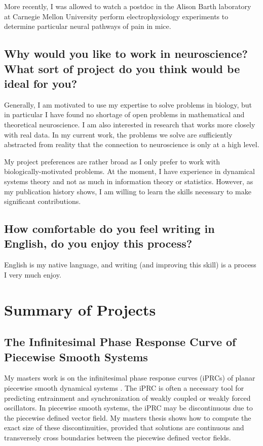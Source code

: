 \documentclass[a4paper,11pt]{article}
\begin{document}
More recently, I was allowed to watch a postdoc in the Alison Barth laboratory at Carnegie Mellon University perform electrophysiology experiments to determine particular neural pathways of pain in mice.

\subsection{Why would you like to work in neuroscience? What sort of project do you think would be ideal for you?}
Generally, I am motivated to use my expertise to solve problems in biology, but in particular I have found no shortage of open problems in mathematical and theoretical neuroscience. I am also interested in research that works more closely with real data. In my current work, the problems we solve are sufficiently abstracted from reality that the connection to neuroscience is only at a high level.

My project preferences are rather broad as I only prefer to work with biologically-motivated problems. At the moment, I have experience in dynamical systems theory and not as much in information theory or statistics. However, as my publication history shows, I am willing to learn the skills necessary to make significant contributions.

\subsection{How comfortable do you feel writing in English, do you enjoy this process?}
English is my native language, and writing (and improving this skill) is a process I very much enjoy.


\section{Summary of Projects}

\subsection{The Infinitesimal Phase Response Curve of Piecewise Smooth Systems}
My masters work is on the infinitesimal phase response curves (iPRCs) of planar piecewise smooth dynamical systems \cite{park2013infinitesimal}. The iPRC is often a necessary tool for predicting entrainment and synchronization of weakly coupled or weakly forced oscillators. In piecewise smooth systems, the iPRC may be discontinuous due to the piecewise defined vector field. My masters thesis shows how to compute the exact size of these discontinuities, provided that solutions are continuous and transversely cross boundaries between the piecewise defined vector fields.
\end{document}
